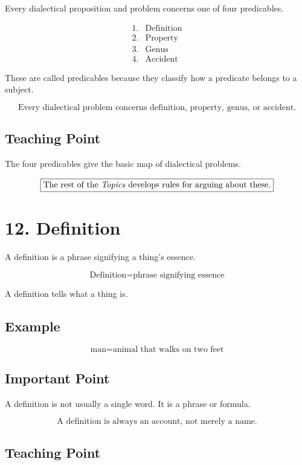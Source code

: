 \documentclass[12pt]{article}
\begin{document}
Every dialectical proposition and problem concerns one of four predicables.

\[
\begin{array}{ll}
1. & \text{Definition} \\
2. & \text{Property} \\
3. & \text{Genus} \\
4. & \text{Accident}
\end{array}
\]

These are called predicables because they classify how a predicate belongs to a
subject.

\[
\boxed{
\text{Every dialectical problem concerns definition, property, genus, or accident.}
}
\]

\subsection*{Teaching Point}

The four predicables give the basic map of dialectical problems.

\[
\boxed{
\text{The rest of the \textit{Topics} develops rules for arguing about these.}
}
\]

\section*{12. Definition}

A definition is a phrase signifying a thing's essence.

\[
\boxed{
\text{Definition} = \text{phrase signifying essence}
}
\]

A definition tells what a thing is.

\subsection*{Example}

\[
\text{man} = \text{animal that walks on two feet}
\]

\subsection*{Important Point}

A definition is not usually a single word. It is a phrase or formula.

\[
\boxed{
\text{A definition is always an account, not merely a name.}
}
\]

\subsection*{Teaching Point}
\end{document}
